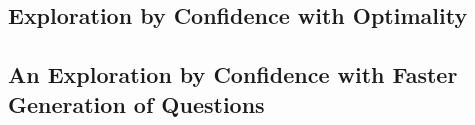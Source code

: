 
\subsection{Exploration by Confidence with Optimality}
\label{sec:expl-conf-1}


\subsection{An Exploration by Confidence with Faster Generation of Questions}
\label{sec:poss-fast-expl}



